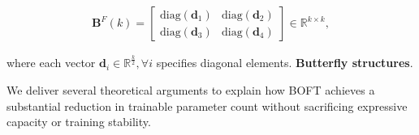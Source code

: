 \begin{equation}\label{eq:but_factor}
\begin{aligned}
    \bm{B}^F(k)=\begin{bmatrix}
    \text{diag}(\bm{d}_1) & \text{diag}(\bm{d}_2) \\
    \text{diag}(\bm{d}_3) & \text{diag}(\bm{d}_4)
    \end{bmatrix}\in\mathbb{R}^{k\times k},
\end{aligned}
\end{equation}

where each vector $\bm{d}_i\in\mathbb{R}^{\frac{k}{2}},\forall i$ specifies diagonal elements. \textbf{Butterfly structures}. \item We deliver several theoretical arguments to explain how BOFT achieves a substantial reduction in trainable parameter count without sacrificing expressive capacity or training stability.